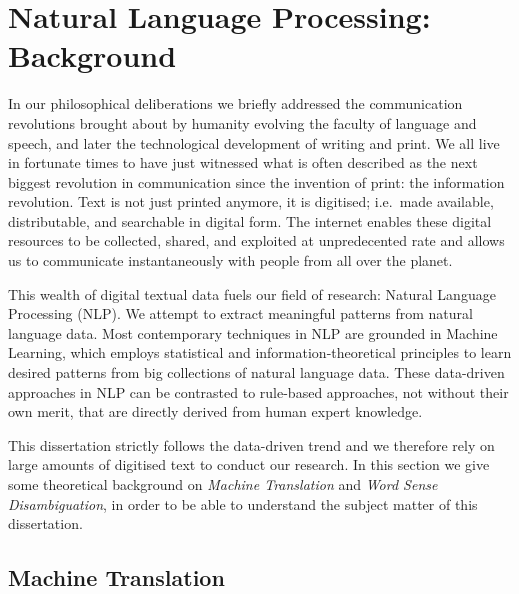 \section{Natural Language Processing: Background}

In our philosophical deliberations we briefly addressed the communication revolutions brought about by humanity evolving
the faculty of language and speech, and later the technological development of writing and print. We all live in
fortunate times to have just witnessed what is often described as the next biggest revolution in communication since the
invention of print: the information revolution. Text is not just printed anymore, it is digitised; i.e.\ made available,
distributable, and searchable in digital form. The internet enables these digital resources to be collected, shared, and
exploited at unpredecented rate and allows us to communicate instantaneously with people from all over the planet.


This wealth of digital textual data fuels our field of research: Natural Language Processing (NLP). We attempt to
extract meaningful patterns from natural language data.  Most contemporary techniques in NLP are grounded in Machine
Learning, which employs statistical and information-theoretical principles to learn desired patterns from big
collections of natural language data. These data-driven approaches in NLP can be contrasted to rule-based approaches,
not without their own merit, that are directly derived from human expert knowledge.

This dissertation strictly follows the data-driven trend and we therefore rely
on large amounts of digitised text to conduct our research. In this section we
give some theoretical background on \emph{Machine Translation} and \emph{Word
Sense Disambiguation}, in order to be able to understand the subject matter of
this dissertation.

\subsection*{Machine Translation}
\label{sec:intromt}


